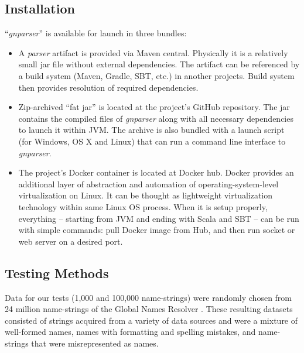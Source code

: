 \documentclass{bmcart}
\begin{document}
\subsection*{Installation}

``\textit{gnparser}'' is available for launch in three bundles:

\begin{itemize}
  \item A \textit{parser} artifact is provided via Maven central. Physically
    it is a relatively small jar file without external dependencies. The
    artifact can be referenced by a build system (Maven, Gradle, SBT, etc.) in
    another projects. Build system then provides resolution of required
    dependencies.

  \item Zip-archived ``fat jar'' is located at the project's GitHub repository.
    The jar contains the compiled files of \textit{gnparser} along with all
    necessary dependencies to launch it within JVM. The archive is also bundled
    with a launch script (for Windows, OS X and Linux) that can run a command
    line interface to \textit{gnparser}.
   

  \item The project's Docker container is located at Docker hub. Docker
    provides an additional layer of abstraction and automation of
    operating-system-level virtualization on Linux. It can be thought as
    lightweight virtualization technology within same Linux OS process. When it
    is setup properly, everything -- starting from JVM and ending with Scala
    and SBT -- can be run with simple commands: pull Docker image from Hub, and
    then run socket or web server on a desired port.

\end{itemize}

\subsection*{Testing Methods}

Data for our tests (1,000 and 100,000 name-strings) were randomly chosen from
24 million name-strings of the Global Names Resolver \cite{resolver:gn}. These
resulting datasets consisted of strings acquired from a variety of data sources
and were a mixture of well-formed names, names with formatting and spelling
mistakes, and name-strings that were misrepresented as names.
\end{document}
